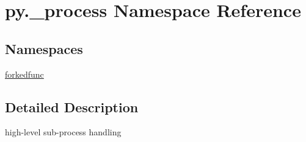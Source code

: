 \hypertarget{namespacepy_1_1__process}{}\section{py.\+\_\+process Namespace Reference}
\label{namespacepy_1_1__process}
\subsection*{Namespaces}
\begin{DoxyCompactItemize}
\item 
 \hyperlink{namespacepy_1_1__process_1_1forkedfunc}{forkedfunc}
\end{DoxyCompactItemize}


\subsection{Detailed Description}
\begin{DoxyVerb}high-level sub-process handling \end{DoxyVerb}
 